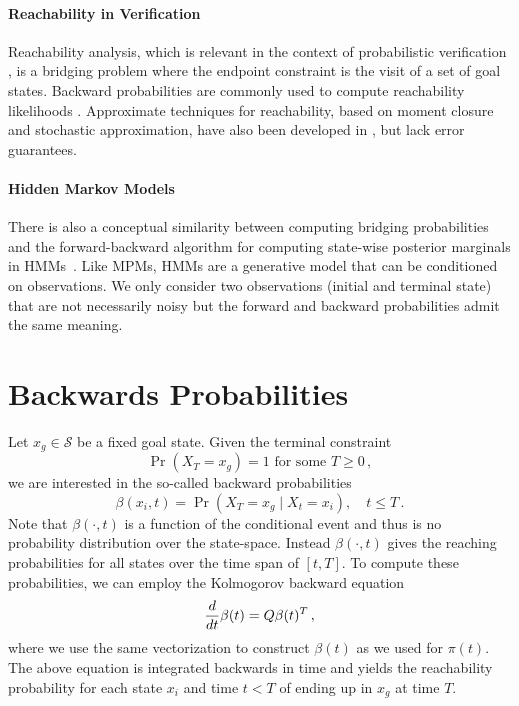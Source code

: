 \paragraph{Reachability in Verification}
Reachability analysis, which is relevant in the context of probabilistic verification \cite{bortolussi2014stochastic,neupane2019stamina}, is a bridging problem where the endpoint constraint is the visit of a set of goal states.
Backward probabilities are commonly used to compute reachability likelihoods \cite{amparore2013backward,zapreev2006safe}.
Approximate techniques for reachability, based on moment closure and stochastic approximation, have also been developed in \cite{bortolussi2014stochastic,Bortolussi18infcomp}, but lack error guarantees. 

\paragraph{Hidden Markov Models}
There is also a conceptual similarity between computing bridging probabilities and the forward-backward algorithm for computing state-wise posterior marginals in \acfp{HMM}~\cite{rabiner1986introduction}. Like \acp{MPM}, \acp{HMM} are a generative model that can be conditioned on observations. We only consider two observations (initial and terminal state) that are not necessarily noisy but the forward and backward probabilities admit the same meaning.


\section{Backwards Probabilities}
Let $x_g\in \mathcal{S}$ be a fixed goal state.
Given the terminal constraint 
\begin{equation}
	\Pr(X_T=x_g)=1 \text{ for some }T\geq 0\,,
\end{equation}
we are interested in the so-called backward probabilities
\begin{equation}\label{eq:back_probs}
\beta(x_i, t) = \Pr(X_T=x_g\mid X_t = x_i),\quad t\leq T\,.
\end{equation}
Note that $\beta(\cdot, t)$ is a function of the conditional event and thus is no probability distribution over the state-space.
Instead $\beta(\cdot, t)$ gives the reaching probabilities for all states over the
time span of $[t, T]$.
To compute these probabilities, we can employ the Kolmogorov backward equation
\begin{equation}\label{eq:backward}
\frac{d}{dt}\beta(t) = Q\beta(t)^{T}\,,
\end{equation}
where we use the same vectorization to construct $\beta(t)$ as we used
for $\pi(t)$.
The above equation is integrated backwards in time and yields the reachability
probability for each state $x_i$ and time $t<T$ of ending up in $x_g$ at time $T$.

